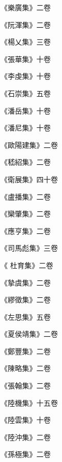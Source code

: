 \begin{pinyinscope}
 《樂廣集》二卷



 《阮渾集》二卷



 《楊乂集》三卷



 《張華集》十卷



 《李虔集》十卷



 《石崇集》五卷



 《潘岳集》十卷



 《潘尼集》十卷



 《歐陽建集》二卷



 《嵇紹集》二卷



 《衛展集》四十卷



 《盧播集》二卷



 《欒肇集》二卷



 《應亨集》二卷



 《司馬彪集》三卷



 《
 杜育集》二卷



 《摯虞集》二卷



 《繆徵集》二卷



 《左思集》五卷



 《夏侯靖集》二卷



 《鄭豐集》二卷



 《陳略集》二卷



 《張翰集》二卷



 《陸機集》十五卷



 《陸雲集》十卷



 《陸沖集》二卷



 《孫極集》二卷




\end{pinyinscope}
